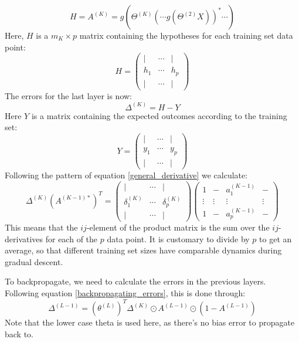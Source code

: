 \documentclass[12pt, a4paper]{article}
\numberwithin{equation}{section}
\begin{document}
\begin{equation}
H=A^{(K)}=g\left(\Theta^{(K)}\left(\cdots g(\Theta^{(2)}X)\right)^*\cdots\right)
\end{equation}
Here, $H$ is a $m_K\times p$ matrix containing the hypotheses for each training set data point:
\begin{equation}
H=
\begin{pmatrix}
|	&	\cdots	& |	\\
h_1	&	\cdots	& h_p \\
|	&	\cdots	& |
\end{pmatrix}
\end{equation}
The errors for the last layer is now:
\begin{equation}
\Delta^{(K)}=H-Y
\end{equation}
Here $Y$ is a matrix containing the expected outcomes according to the training set:
\begin{equation}
Y=
\begin{pmatrix}
|	&	\cdots	& |	\\
y_1	&	\cdots	& y_p \\
|	&	\cdots	& |
\end{pmatrix}
\end{equation}
Following the pattern of equation \ref{general_derivative} we calculate:
\begin{equation}
\Delta^{(K)}\left(A^{(K-1)*}\right)^T=\begin{pmatrix}
|	&	\cdots	& |	\\
\delta^{(K)}_1	&	\cdots	& \delta^{(K)}_p \\
|	&	\cdots	& |
\end{pmatrix}
\begin{pmatrix}
1 & -	& a^{(K-1)}_1	&	- \\
\vdots & \vdots	& \vdots	& \vdots \\
1 & -	& a^{(K-1)}_p	&	-
\end{pmatrix}
\end{equation}
This means that the $ij$-element of the product matrix is the sum over the $ij$-derivatives for each of the $p$ data point. It is customary to divide by $p$ to get an average, so that different training set sizes have comparable dynamics during gradual descent.

To backpropagate, we need to calculate the errors in the previous layers. Following equation \ref{backpropagating_errors}, this is done through:
\begin{equation}
\Delta^{(L-1)}=\left(\theta^{(L)}\right)^T\Delta^{(K)}\odot A^{(L-1)}\odot(1-A^{(L-1)})
\end{equation}
Note that the lower case theta is used here, as there's no bias error to propagate back to.
\end{document}
